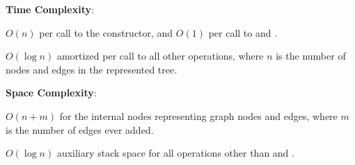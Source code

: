 \textbf{Time Complexity}:
\begin{compactitem}
  \item $O(n)$ per call to the constructor, and $O(1)$ per call to  and .
  \item $O(\log n)$ amortized per call to all other operations, where $n$ is the number of nodes and edges in the represented tree.
\end{compactitem}

\textbf{Space Complexity}:
\begin{compactitem}
  \item $O(n + m)$ for the internal nodes representing graph nodes and edges, where $m$ is the number of edges ever added.
  \item $O(\log n)$ auxiliary stack space for all operations other than  and .
\end{compactitem}

